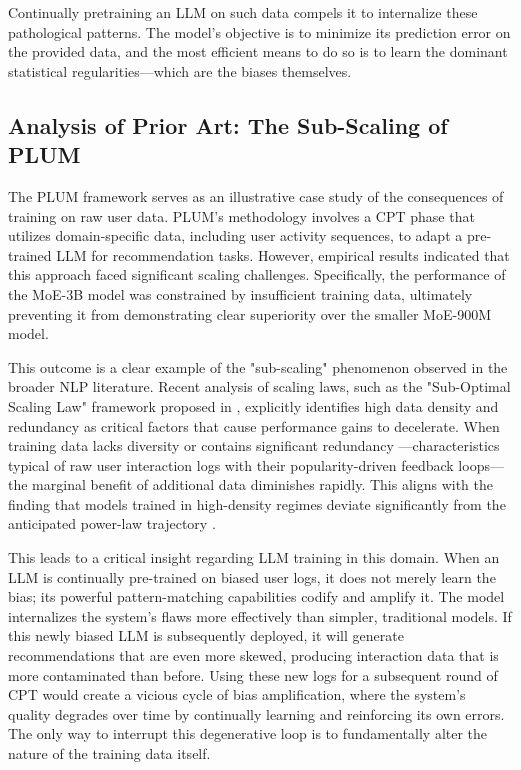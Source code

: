 \documentclass[]{fairmeta}
\begin{document}
Continually pretraining an LLM on such data compels it to internalize these pathological patterns. The model's objective is to minimize its prediction error on the provided data, and the most efficient means to do so is to learn the dominant statistical regularities—which are the biases themselves.
\subsection{Analysis of Prior Art: The Sub-Scaling of PLUM}
The PLUM \cite{hePLUMAdaptingPretrained2025} framework serves as an illustrative case study of the consequences of training on raw user data. PLUM's methodology involves a CPT phase that utilizes domain-specific data, including user activity sequences, to adapt a pre-trained LLM for recommendation tasks. However, empirical results indicated that this approach faced significant scaling challenges. Specifically, the performance of the MoE-3B model was constrained by insufficient training data, ultimately preventing it from demonstrating clear superiority over the smaller MoE-900M model.

This outcome is a clear example of the "sub-scaling" phenomenon observed in the broader NLP literature. Recent analysis of scaling laws, such as the "Sub-Optimal Scaling Law" framework proposed in \cite{chen2025subscalinglawsroledata}, explicitly identifies high data density and redundancy as critical factors that cause performance gains to decelerate. When training data lacks diversity or contains significant redundancy \cite{tirumala2023d4improvingllmpretraining, he2024softdedupefficientdatareweighting}—characteristics typical of raw user interaction logs with their popularity-driven feedback loops—the marginal benefit of additional data diminishes rapidly. This aligns with the finding that models trained in high-density regimes deviate significantly from the anticipated power-law trajectory .

This leads to a critical insight regarding LLM training in this domain. When an LLM is continually pre-trained on biased user logs, it does not merely learn the bias; its powerful pattern-matching capabilities codify and amplify it. The model internalizes the system's flaws more effectively than simpler, traditional models. If this newly biased LLM is subsequently deployed, it will generate recommendations that are even more skewed, producing interaction data that is more contaminated than before. Using these new logs for a subsequent round of CPT would create a vicious cycle of bias amplification, where the system's quality degrades over time by continually learning and reinforcing its own errors. The only way to interrupt this degenerative loop is to fundamentally alter the nature of the training data itself.
\end{document}
